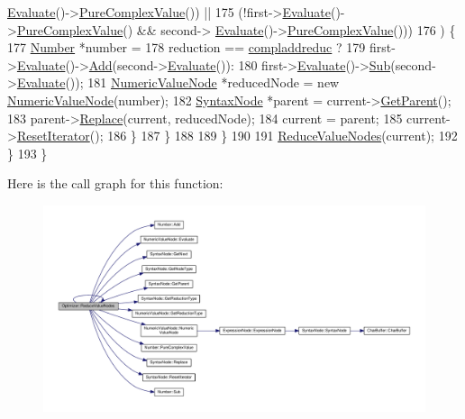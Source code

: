\begin{DoxyCode}
      \hyperlink{classNumericValueNode_abdd2e6fd1723488a24a645fec481a971}{Evaluate}()->\hyperlink{structNumber_a037b461c2c9189c00b11f395a325735d}{PureComplexValue}()) ||
175                      (!first->\hyperlink{classNumericValueNode_abdd2e6fd1723488a24a645fec481a971}{Evaluate}()->\hyperlink{structNumber_a037b461c2c9189c00b11f395a325735d}{PureComplexValue}() && second->
      \hyperlink{classNumericValueNode_abdd2e6fd1723488a24a645fec481a971}{Evaluate}()->\hyperlink{structNumber_a037b461c2c9189c00b11f395a325735d}{PureComplexValue}()))
176                 ) \{
177                     \hyperlink{structNumber}{Number} *number =
178                         reduction == \hyperlink{nodes_8h_ab321a69ad5704b704b8dd9e1b3984a29ac930999b75ae22f50a2fa8d774a80936}{compladdreduc} ?
179                         first->\hyperlink{classNumericValueNode_abdd2e6fd1723488a24a645fec481a971}{Evaluate}()->\hyperlink{structNumber_af38172a47d725f10b8586846cb06e8a4}{Add}(second->\hyperlink{classNumericValueNode_abdd2e6fd1723488a24a645fec481a971}{Evaluate}()):
180                         first->\hyperlink{classNumericValueNode_abdd2e6fd1723488a24a645fec481a971}{Evaluate}()->\hyperlink{structNumber_ae64075f6f73ded559499d3156bde0bdb}{Sub}(second->\hyperlink{classNumericValueNode_abdd2e6fd1723488a24a645fec481a971}{Evaluate}());
181                     \hyperlink{classNumericValueNode}{NumericValueNode} *reducedNode = \textcolor{keyword}{new} 
      \hyperlink{classNumericValueNode}{NumericValueNode}(number);
182                     \hyperlink{classSyntaxNode}{SyntaxNode} *parent = current->\hyperlink{classSyntaxNode_a4a85fd710ad44edbc5b3ac625c10cd08}{GetParent}();
183                     parent->\hyperlink{classSyntaxNode_a2797ff5eb05f3a36ae1be41b70105e05}{Replace}(current, reducedNode);
184                     current = parent;
185                     current->\hyperlink{classSyntaxNode_ac51307368fb255aa760b99e137178c89}{ResetIterator}();
186                 \}
187             \}
188 
189         \}
190 
191         \hyperlink{classOptimizer_a5b45089aff3c6568f3531faa9e701f21}{ReduceValueNodes}(current);
192     \}
193 \}
\end{DoxyCode}


Here is the call graph for this function\+:
\nopagebreak
\begin{figure}[H]
\begin{center}
\leavevmode
\includegraphics[width=350pt]{d1/dc4/classOptimizer_a5b45089aff3c6568f3531faa9e701f21_cgraph}
\end{center}
\end{figure}




